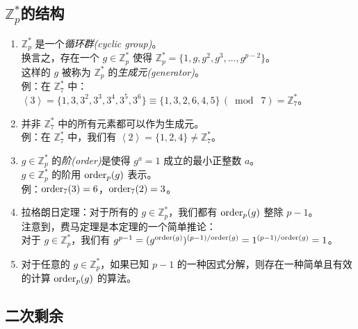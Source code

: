\subsection{$\mathbb{Z}_p^*$的结构}\label{subsec:A-2-2}

\begin{enumerate}
	\item $\mathbb{Z}_p^*$ 是一个\emph{循环群(cyclic group)}。\\
	换言之，存在一个 $g\in\mathbb{Z}_p^*$ 使得 $\mathbb{Z}_p^*=\{1,g,g^2,g^3,\dots, g^{p-2}\}$。\\
	这样的 $g$ 被称为 $\mathbb{Z}_p^*$ 的\emph{生成元(generator)}。\\
    例：在 $\mathbb{Z}_7^*$ 中：$\left\langle3\right\rangle=\{1,3,3^2,3^3,3^ 4,3^5,3^6\} \equiv\{1,3,2,6,4,5\}\,(\bmod\;7)=\mathbb{Z}_7^*$。
    \item 并非 $\mathbb{Z}_7^*$ 中的所有元素都可以作为生成元。\\
    例：在 $\mathbb{Z}_7^*$ 中，我们有 $\left\langle2\right\rangle=\{1,2,4\}\neq\mathbb{Z}_7^*$。
	\item $g\in\mathbb{Z}_p^*$ 的\emph{阶(order)}是使得 $g^a=1$ 成立的最小正整数 $a$。\\
    $g\in\mathbb{Z}_p^*$ 的阶用 ${\rm order}_p(g)$ 表示。\\
    例：${\rm order}_7(3)=6$，${\rm order}_7(2)=3$。
	\item 拉格朗日定理：对于所有的 $g\in\mathbb{Z}_p^*$，我们都有 ${\rm order}_p(g)$ 整除 $p-1$。\\
    注意到，费马定理是本定理的一个简单推论：\\
    \hspace*{30pt} 对于 $g\in\mathbb{Z}_p^*$，我们有 $g^{p-1}=(g^{{\rm order}(g)})^{(p-1)/{\rm order}(g)}=1^{(p-1)/{\rm order}(g)}=1$。
	\item 对于任意的 $g\in\mathbb{Z}_p^*$，如果已知 $p-1$ 的一种因式分解，则存在一种简单且有效的计算 ${\rm order}_p(g)$ 的算法。
\end{enumerate}

\subsection{二次剩余}\label{subsec:A-2-3}

